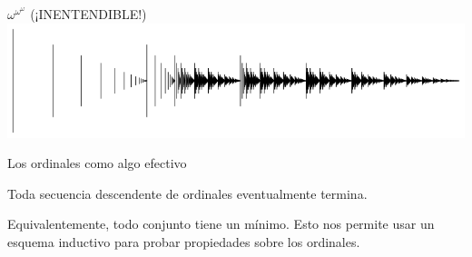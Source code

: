 \documentclass[10pt,spanish]{beamer}
\begin{document}
\begin{frame}{$\omega^{\omega^\omega}$ (¡INENTENDIBLE!)}
\includegraphics[scale=0.4]{w^w^w.png}
\end{frame}

\begin{frame}{Los ordinales como algo efectivo}

	
	
\pause	Toda secuencia descendente de ordinales eventualmente termina.

	Equivalentemente, todo conjunto tiene un mínimo. Esto nos permite usar un esquema inductivo para probar propiedades sobre los ordinales.

\end{frame}
\end{document}
